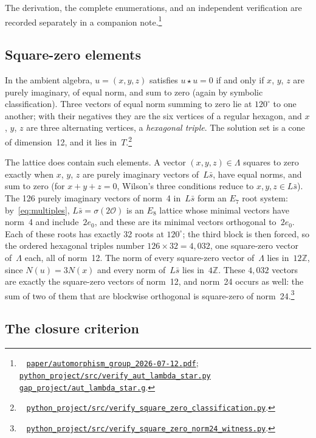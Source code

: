 \documentclass[twoside,english]{paper}
\numberwithin{equation}{section}
\numberwithin{figure}{section}
\theoremstyle{definition}
\theoremstyle{remark}
\newcommand{\MO}{\mathcal{O}}         %
\newcommand{\ZZ}{\mathbb{Z}}
\newcommand{\LL}{\Lambda}             %
\newcommand{\Nrm}{N}                  %
\newcommand{\scriptref}[1]{\cite{repo}~%
  \href{https://github.com/koeplinger/leech\_alg/blob/main/python\_project/src/#1}%
  {\nolinkurl{python_project/src/#1}}}
\newcommand{\gapref}[1]{\cite{repo}~%
  \href{https://github.com/koeplinger/leech\_alg/blob/main/gap\_project/#1}%
  {\nolinkurl{gap_project/#1}}}
\begin{document}
The derivation, the complete enumerations, and an
independent verification are recorded separately in a companion
note.\footnote{\cite{repo}~%
\href{https://github.com/koeplinger/leech\_alg/blob/main/paper/automorphism\_group\_2026-07-12.pdf}%
{\texttt{paper/automorphism\_group\_2026-07-12.pdf}};
\scriptref{verify\_aut\_lambda\_star.py}
\gapref{aut\_lambda\_star.g}.}

\subsection{Square-zero elements}\label{sec:squarezero}

In the ambient algebra, $u = (x, y, z)$ satisfies $u \star u = 0$ if
and only if $x$, $y$, $z$ are purely imaginary, of equal norm, and sum
to zero (again by symbolic classification).  Three vectors of equal norm summing to zero lie at $120^\circ$
to one another; with their negatives they are the six vertices of a
regular hexagon, and $x$, $y$, $z$ are three alternating vertices, a
\emph{hexagonal triple}.  The solution set is
a cone of dimension~12, and it lies in~$T$.\footnote{\scriptref{verify\_square\_zero\_classification.py}.}

The lattice does contain such elements.  A vector $(x, y, z) \in \LL$
squares to zero exactly when $x$, $y$, $z$ are purely imaginary vectors
of~$L\bar s$, have equal norms, and sum to zero (for $x + y + z = 0$,
Wilson's three conditions reduce to $x, y, z \in L\bar s$).  The 126 purely imaginary
vectors of norm~4 in~$L\bar s$ form an $E_7$ root system:
by~\eqref{eq:multiples}, $L\bar s = \sigma(2\MO)$ is an $E_8$ lattice
whose minimal vectors have norm~4 and include~$2e_0$, and these are its
minimal vectors orthogonal to~$2e_0$.  Each of these roots has exactly
32 roots at $120^\circ$; the third block is then
forced, so the ordered hexagonal triples number $126 \times 32 = 4{,}032$,
one square-zero vector of~$\LL$ each, all of norm~12.  The norm of
every square-zero vector of~$\LL$ lies in~$12\ZZ$, since
$\Nrm(u) = 3\Nrm(x)$ and every norm of~$L\bar s$ lies in~$4\ZZ$.  These
$4{,}032$ vectors are exactly the square-zero vectors of norm~12, and
norm~24 occurs as well: the sum of two of them that are blockwise
orthogonal is square-zero of norm~24.\footnote{\scriptref{verify\_square\_zero\_norm24\_witness.py}.}

\subsection{The closure criterion}\label{sec:criterion}
\end{document}
